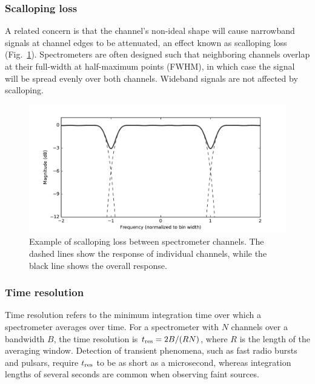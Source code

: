 \documentclass{ws-rv961x669}
\begin{document}
\subsubsection{Scalloping loss} 

A related concern is that the channel's non-ideal shape will cause narrowband signals at channel edges to be attenuated, an effect known as scalloping loss (Fig.~\ref{fig:scalloping}). Spectrometers are often designed such that neighboring channels overlap at their full-width at half-maximum points (FWHM), in which case the signal will be spread evenly over both channels. Wideband signals are not affected by scalloping. 

\begin{figure}
 \centering
 \includegraphics[width=\textwidth]{./figures/pfb_scalloping}
 \caption{Example of scalloping loss between spectrometer channels. The dashed lines show the response of individual channels, while the black line shows the overall response.\label{fig:scalloping}}
\end{figure}

\subsubsection{Time resolution}\label{sub:time-res} 

Time resolution refers to the minimum integration time over which a spectrometer averages over time. For a spectrometer with $N$ channels over a bandwidth $B$, the time resolution is $t_{\rm{res}} = 2B/(RN)$, where $R$ is the length of the averaging window. Detection of transient phenomena, such as fast radio bursts %
 and pulsars, require $t_{\rm{res}}$ to be as short as a microsecond, whereas integration lengths of several seconds are common when observing faint sources.  %
\end{document}

